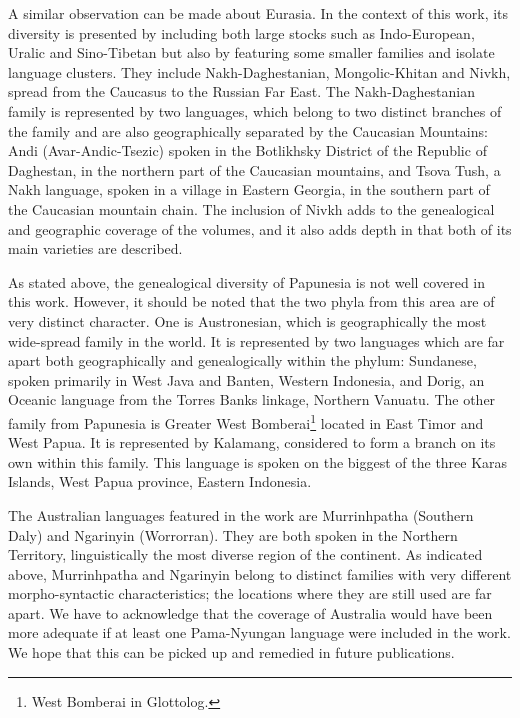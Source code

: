 \documentclass[output=paper,colorlinks,citecolor=brown]{langscibook}
\begin{document}
A similar observation can be made about Eurasia. In the context of this work, its diversity is presented by including both large stocks such as Indo-European, Uralic and Sino-Tibetan but also by featuring some smaller families and isolate language clusters. They include Nakh-Daghestanian, Mongolic-Khitan and Nivkh, spread from the Caucasus to the Russian Far East. The Nakh-Daghestanian family is represented by two languages, which belong to two distinct branches of the family and are also geographically separated by the Caucasian Mountains: Andi (Avar-Andic-Tsezic) spoken in the Botlikhsky District of the Republic of Daghestan, in the northern part of the Caucasian mountains, and Tsova Tush, a Nakh language, spoken in a village in Eastern Georgia, in the southern part of the Caucasian mountain chain. The inclusion of Nivkh adds to the genealogical and geographic coverage of the volumes, and it also adds depth in that both of its main varieties are described.  

As stated above, the genealogical diversity of Papunesia is not well covered in this work. However, it should be noted that the two phyla from this area are of very distinct character. One is Austronesian, which is geographically the most wide-spread family in the world. It is represented by two languages which are far apart both geographically and genealogically within the phylum: Sundanese, spoken primarily in West Java and Banten, Western Indonesia, and Dorig, an Oceanic language from the Torres Banks linkage, Northern Vanuatu. The other family from Papunesia is Greater West Bomberai\footnote{West Bomberai in Glottolog.} located in East Timor and West Papua. It is represented by Kalamang, considered to form a branch on its own within this family. This language is spoken on the biggest of the three Karas Islands, West Papua province, Eastern Indonesia. 

The Australian languages featured in the work are  Murrinhpatha (Southern Daly) and Ngarinyin (Worrorran). They are both spoken in the Northern Territory, linguistically the most diverse region of the continent. As indicated above,  Murrinhpatha and Ngarinyin belong to distinct families with very different morpho-syntactic characteristics; the locations where they are still used are far apart. We have to acknowledge that the coverage of Australia would have been more adequate if at least one Pama-Nyungan language were included in the work. We hope that this can be picked up and remedied in future publications.

\end{document}
